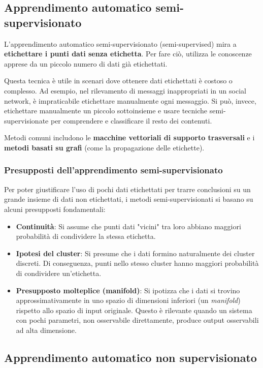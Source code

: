 \subsection{Apprendimento automatico semi-supervisionato}

L'apprendimento automatico semi-supervisionato (semi-supervised)
mira a \textbf{etichettare i punti dati senza etichetta}.
Per fare ciò, utilizza le conoscenze apprese da un
piccolo numero di dati già etichettati.

Questa tecnica è utile in scenari dove ottenere dati etichettati è
costoso o complesso. Ad esempio, nel rilevamento di messaggi
inappropriati in un social network, è impraticabile etichettare
manualmente ogni messaggio. Si può, invece, etichettare
manualmente un piccolo sottoinsieme e usare tecniche
semi-supervisionate per comprendere e classificare il resto dei
contenuti.

Metodi comuni includono le \textbf{macchine vettoriali di supporto
trasversali} e i \textbf{metodi basati su grafi} (come la
propagazione delle etichette).

\subsubsection{Presupposti dell'apprendimento semi-supervisionato}

Per poter giustificare l'uso di pochi dati etichettati per trarre
conclusioni su un grande insieme di dati non etichettati, i metodi
semi-supervisionati si basano su alcuni presupposti fondamentali:
\begin{itemize}
    \item \textbf{Continuità}: Si assume che punti dati "vicini" tra
    loro abbiano maggiori probabilità di condividere la stessa
    etichetta.
    \item \textbf{Ipotesi del cluster}: Si presume che i dati formino
    naturalmente dei cluster discreti. Di conseguenza,
    punti nello stesso cluster hanno maggiori probabilità di
    condividere un'etichetta.
    \item \textbf{Presupposto molteplice (manifold)}: Si ipotizza che
    i dati si trovino approssimativamente in uno spazio di
    dimensioni inferiori (un \textit{manifold}) rispetto allo
    spazio di input originale. Questo è rilevante
    quando un sistema con pochi parametri, non osservabile
    direttamente, produce output osservabili ad alta
    dimensione.
\end{itemize}

\subsection{Apprendimento automatico non supervisionato}

